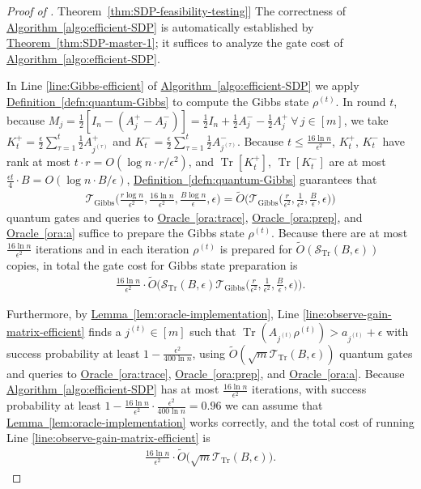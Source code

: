 \documentclass[a4paper,UKenglish,cleveref, autoref]{lipics-v2019}
\theoremstyle{remark}
\numberwithin{equation}{section}
\numberwithin{oracle}{section}
\numberwithin{remark}{section}
\newcommand{\ora}[1]{\hyperref[ora:#1]{Oracle~\ref*{ora:#1}}}
\newcommand{\thm}[1]{\hyperref[thm:#1]{Theorem~\ref*{thm:#1}}}
\newcommand{\defn}[1]{\hyperref[defn:#1]{Definition~\ref*{defn:#1}}}
\newcommand{\lem}[1]{\hyperref[lem:#1]{Lemma~\ref*{lem:#1}}}
\newcommand{\algo}[1]{\hyperref[algo:#1]{Algorithm~\ref*{algo:#1}}}
\newcommand{\range}[1]{[#1]}
\DeclareMathOperator{\tr}{Tr}
\DeclareMathOperator{\Tr}{Tr}
\begin{document}
\begin{proof}[Proof of \thm{SDP-feasibility-testing}]
The correctness of \algo{efficient-SDP} is automatically established by \thm{SDP-master-1}; it suffices to analyze the gate cost of \algo{efficient-SDP}.

In Line \ref{line:Gibbs-efficient} of \algo{efficient-SDP} we apply \defn{quantum-Gibbs} to compute the Gibbs state $\rho^{(t)}$. In round $t$, because $M_{j}=\frac{1}{2}[I_{n}-(A_{j}^{+}-A_{j}^{-})]=\frac{1}{2}I_{n}+\frac{1}{2}A_{j}^{-}-\frac{1}{2}A_{j}^{+}\ \forall\,j\in\range{m}$, we take $K_{t}^{+}=\frac{\epsilon}{2}\sum_{\tau=1}^{t}\frac{1}{2}A_{j^{(\tau)}}^{+}$ and $K_{t}^{-}=\frac{\epsilon}{2}\sum_{\tau=1}^{t}\frac{1}{2}A_{j^{(\tau)}}^{-}$. Because $t\leq\frac{16\ln n}{\epsilon^{2}}$, $K_{t}^{+}$, $K_{t}^{-}$ have rank at most $t\cdot r=O(\log n\cdot r/\epsilon^{2})$, and $\Tr[K_{t}^{+}]$, $\Tr[K_{t}^{-}]$ are at most $\frac{\epsilon t}{4}\cdot B=O(\log n\cdot B/\epsilon)$, \defn{quantum-Gibbs} guarantees that
\begin{align}
\mathcal{T}_{\text{Gibbs}}\Big(\frac{r\log n}{\epsilon^{2}},\frac{16\ln n}{\epsilon^{2}},\frac{B\log n}{\epsilon},\epsilon\Big)=\tilde{O}\Big(\mathcal{T}_{\text{Gibbs}}\Big(\frac{r}{\epsilon^{2}},\frac{1}{\epsilon^{2}},\frac{B}{\epsilon},\epsilon\Big)\Big)
\end{align}
quantum gates and queries to \ora{trace}, \ora{prep}, and \ora{a} suffice to prepare the Gibbs state $\rho^{(t)}$. Because there are at most $\frac{16\ln n}{\epsilon^{2}}$ iterations and in each iteration $\rho^{(t)}$ is prepared for $\tilde{O}(\mathcal{S}_{\tr}(B,\epsilon))$ copies, in total the gate cost for Gibbs state preparation is
\begin{align}\label{eqn:cost-quantum-1}
\frac{16\ln n}{\epsilon^{2}}\cdot\tilde{O}\Big(\mathcal{S}_{\tr}(B,\epsilon)\mathcal{T}_{\text{Gibbs}}\Big(\frac{r}{\epsilon^{2}},\frac{1}{\epsilon^{2}},\frac{B}{\epsilon},\epsilon\Big)\Big).
\end{align}

Furthermore, by \lem{oracle-implementation}, Line \ref{line:observe-gain-matrix-efficient} finds a $j^{(t)}\in\range{m}$ such that $\tr(A_{j^{(t)}} \rho^{(t)})>a_{j^{(t)}}+\epsilon$ with success probability at least $1-\frac{\epsilon^{2}}{400\ln n}$, using $\tilde{O}(\sqrt{m}\mathcal{T}_{\tr}(B,\epsilon))$ quantum gates and queries to \ora{trace}, \ora{prep}, and \ora{a}. Because \algo{efficient-SDP} has at most $\frac{16\ln n}{\epsilon^{2}}$ iterations, with success probability at least $1-\frac{16\ln n}{\epsilon^{2}}\cdot\frac{\epsilon^{2}}{400\ln n}=0.96$ we can assume that \lem{oracle-implementation} works correctly, and the total cost of running Line \ref{line:observe-gain-matrix-efficient} is
\begin{align}\label{eqn:cost-quantum-2}
\frac{16\ln n}{\epsilon^{2}}\cdot\tilde{O}\big(\sqrt{m}\mathcal{T}_{\tr}(B,\epsilon)\big).
\end{align}


\end{proof}
\end{document}
